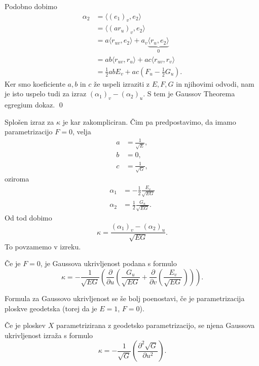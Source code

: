 Podobno dobimo \begin{align*}
    \alpha_2 &= \langle (e_1)_v, e_2 \rangle  \\
     &= \langle (a r_u)_v, e_2 \rangle  \\
     &= a \langle r_{uv}, e_2 \rangle + a_v \underbrace{\langle r_u, e_2 \rangle}_0  \\
    &= ab \langle r_{uv}, r_u \rangle + ac \langle r_{uv}, r_v \rangle \\
    &= \frac{1}{2} ab E_v + ac \left(F_u - \frac{1}{2} G_u \right). 
\end{align*}
Ker smo koeficiente $a, b$ in $c$ že uspeli izraziti z $E, F, G$ in njihovimi odvodi, nam je isto uspelo tudi za izraz $(\alpha_1)_v - (\alpha_2)_u$.
S tem je Gaussov Theorema egregium dokaz.
\qed

\begin{opomba}
Splošen izraz za $\kappa$ je kar zakompliciran. Čim pa predpostavimo, da imamo parametrizacijo $F  =0$, velja \begin{align*}
    a &= \frac{1}{\sqrt{E} },\\
    b &= 0, \\
    c &= \frac{1}{\sqrt{G}},
\end{align*}oziroma \begin{align*}
    \alpha_1 &= -\frac{1}{2} \frac{E_v}{\sqrt{EG} } \\
    \alpha_2 &= \frac{1}{2} \frac{G_u}{\sqrt{EG} }.
\end{align*}
Od tod dobimo \begin{equation*}
\kappa  = \frac{(\alpha_1)_v - (\alpha_2)_u}{\sqrt{EG}}.
\end{equation*}
To povzamemo v izreku.
\end{opomba}

\begin{izrek}
\label{izr_gaussova_ukrivljenost_v_primeru_F_enako_0}
Če je $F = 0$, je Gaussova ukrivljenost podana s formulo \begin{equation*}
\kappa = - \frac{1}{\sqrt{EG}} \left(\frac{ \partial  }{ \partial u }  \left(  \frac{G_u}{\sqrt{EG} } + \frac{ \partial  }{ \partial v } \left( \frac{E_v}{\sqrt{EG} } \right)  \right)   \right).
\end{equation*}  
\end{izrek}

Formula za Gaussovo ukrivljenost se še bolj poenostavi, če je parametrizacija ploskve geodetska (torej da je $E = 1$, $F = 0$).

\begin{izrek}
\label{izr_gaussova_ukrivljenost_pri_geodetski_parametrizaciji}
 Če je ploskev $X$ parametrizirana z geodetsko parametrizacijo, se njena Gaussova ukrivljenost izraža s formulo \begin{equation*}
 \kappa = - \frac{1}{\sqrt{G}} \left(  \frac{ \partial^{2} \sqrt{G}  }{ \partial u^{2} }  \right).
 \end{equation*}  
\end{izrek}

